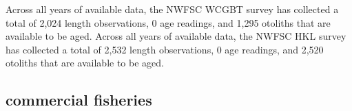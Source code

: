 \documentclass[11pt,
  english,
  letterpaper,
]{article}
\begin{document}
Across all years of available data, the NWFSC WCGBT survey has collected a total of 2,024 length observations, 0 age readings, and 1,295 otoliths that are available to be aged. Across all years of available data, the NWFSC HKL survey has collected a total of 2,532 length observations, 0 age readings, and 2,520 otoliths that are available to be aged.

\leavevmode\tagmcend\tagstructend\par


\hypertarget{commercial-fisheries-2}{%
\subsection{commercial fisheries}\label{commercial-fisheries-2}}

\leavevmode\tagmcend\tagstructend


\begingroup\fontsize{10}{12}\selectfont \begingroup\fontsize{10}{12}\selectfont

\leavevmode\tagmcend\tagstructend\par
\end{document}
